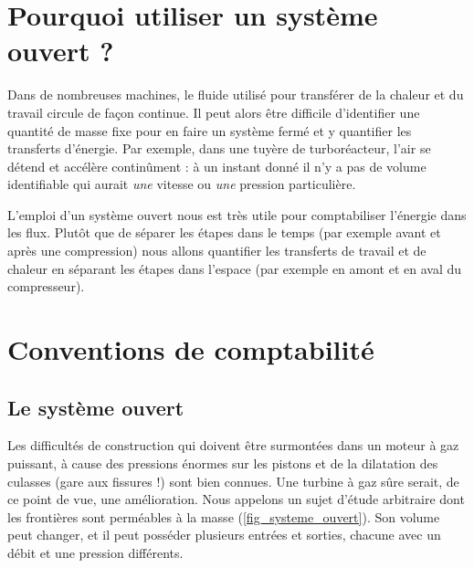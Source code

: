 \section{Pourquoi utiliser un système ouvert ?}

	Dans de nombreuses machines, le fluide utilisé pour transférer de la chaleur et du travail circule de façon continue. Il peut alors être difficile d’identifier une quantité de masse fixe pour en faire un système fermé et y quantifier les transferts d’énergie. Par exemple, dans une tuyère de turboréacteur, l’air se détend et accélère continûment : à un instant donné il n’y a pas de volume identifiable qui aurait \emph{une} vitesse ou \emph{une} pression particulière.
	
	L’emploi d’un système ouvert nous est très utile pour comptabiliser l’énergie dans les flux. Plutôt que de séparer les étapes dans le temps (par exemple avant et après une compression) nous allons quantifier les transferts de travail et de chaleur en séparant les étapes dans l’espace (par exemple en amont et en aval du compresseur).

\section{Conventions de comptabilité}
\label{ch_conventions_compta_so}

	\subsection{Le système ouvert}

			Les difficultés de construction qui doivent être surmontées dans un moteur à gaz puissant, à cause des pressions énormes sur les pistons et de la dilatation des culasses (gare aux fissures !) sont bien connues. Une turbine à gaz sûre serait, de ce point de vue, une amélioration.
		Nous appelons  un sujet d’étude arbitraire dont les frontières sont perméables à la masse (\cref{fig_systeme_ouvert}). Son volume peut changer, et il peut posséder plusieurs entrées et sorties, chacune avec un débit et une pression différents.

